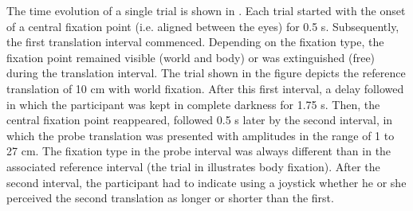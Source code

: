 The time evolution of a single trial is shown in . Each trial started with the onset of a central fixation point (i.e. aligned between the eyes) for 0.5 \si{\second}. Subsequently, the first translation interval commenced.  Depending on the fixation type, the fixation point remained visible (world and body) or was extinguished (free) during the translation interval. The trial shown in the figure depicts the reference translation of 10 \si{\centi\metre} with world fixation. After this first interval, a delay followed in which the participant was kept in complete darkness for 1.75 \si{\second}. Then, the central fixation point reappeared, followed 0.5 \si{\second} later by the second interval, in which the probe translation was presented with amplitudes in the range of 1 to 27 \si{\centi\metre}. The fixation type in the probe interval was always different than in the associated reference interval (the trial in  illustrates body fixation). After the second interval, the participant had to indicate using a joystick whether he or she perceived the second translation as longer or shorter than the first.

